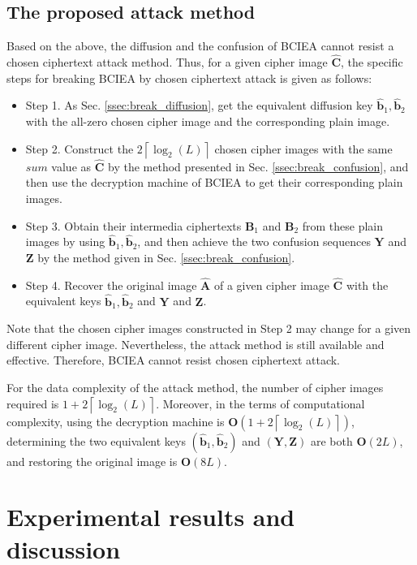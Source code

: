 \documentclass[final,3p,times,twocolumn]{elsarticle}
\begin{document}
\subsection{The proposed attack method}
\label{ssec:break_BCIEA}

Based on the above, the diffusion and the confusion of BCIEA cannot resist a chosen ciphertext attack method. Thus, for a given cipher image $\bm{\hat{C}}$, the specific steps for breaking BCIEA by chosen ciphertext attack is given as follows:
\begin{itemize}
	\item Step 1. As Sec. \ref{ssec:break_diffusion}, get the equivalent diffusion key $\bm{\hat{b}}_1,\bm{\hat{b}}_2$ with the all-zero chosen cipher image and the corresponding plain image. 
	
	\item Step 2. Construct the $2 \left\lceil {\log_{2}(L)} \right\rceil$ chosen cipher images with the same $sum$ value as $\bm{\hat{C}}$ by the method presented in Sec. \ref{ssec:break_confusion}, and then use the decryption machine of BCIEA to get their corresponding plain images.
	
	\item Step 3. Obtain their intermedia ciphertexts $\bm{B}_1$ and $\bm{B}_2$  from these plain images by using $\bm{\hat{b}}_1,\bm{\hat{b}}_2$, and then achieve the two confusion sequences $\bm{Y}$ and $\bm{Z}$ by the method given in Sec. \ref{ssec:break_confusion}.
	
	\item Step 4. Recover the original image $\bm{\hat{A}}$ of a given cipher image $\bm{\hat{C}}$ with the equivalent keys $\bm{\hat{b}}_1,\bm{\hat{b}}_2$ and $\bm{Y}$ and $\bm{Z}$. 
\end{itemize}

Note that the chosen cipher images constructed in Step 2 may change for a given different cipher image. Nevertheless, the attack method is still available and effective. Therefore, BCIEA cannot resist chosen ciphertext attack. 

For the data complexity of the attack method, the number of cipher images required is $1+2 \left\lceil {\log_{2}(L)} \right\rceil$.
Moreover, in the terms of computational complexity, using the decryption machine is $\bm{O}(1+2 \left\lceil {\log_{2}(L)} \right\rceil)$, determining the two equivalent keys $(\bm{\hat{b}}_1,\bm{\hat{b}}_2)$ and $(\bm{Y},\bm{Z})$ are both $\bm{O}(2L)$, and restoring the original image is $\bm{O}(8L)$.
%
\section{Experimental results and discussion}
\label{sec4:Experiments}
%
\end{document}
